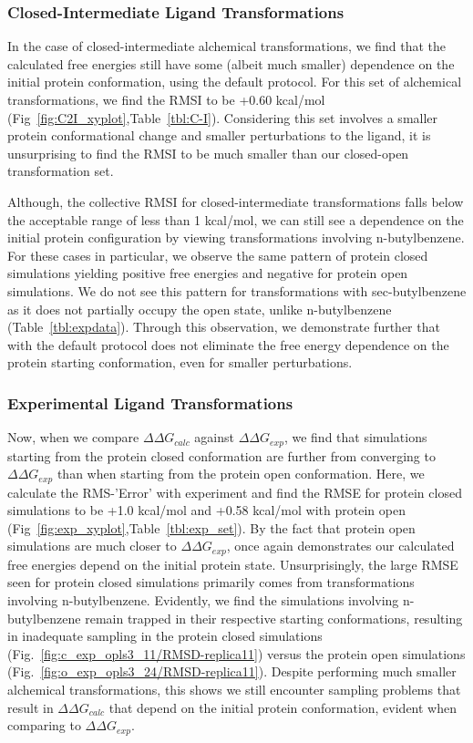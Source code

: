 \documentclass[journal=jctcce,manuscript=article]{achemso}
\begin{document}
\subsubsection*{Closed-Intermediate Ligand Transformations}
In the case of closed-intermediate alchemical transformations, we find that the calculated free energies still have some (albeit much smaller) dependence on the initial protein conformation, using the default protocol.
For this set of alchemical transformations, we find the RMSI to be +0.60 kcal/mol (Fig~\ref{fig:C2I_xyplot},Table~\ref{tbl:C-I}).
Considering this set involves a smaller protein conformational change and smaller perturbations to the ligand, it is unsurprising to find the RMSI to be much smaller than our closed-open transformation set.

Although, the collective RMSI for closed-intermediate transformations falls below the acceptable range of less than 1 kcal/mol, we can still see a dependence on the initial protein configuration by viewing transformations involving n-butylbenzene.
For these cases in particular, we observe the same pattern of protein closed simulations yielding positive free energies and negative for protein open simulations. 
We do not see this pattern for transformations with sec-butylbenzene as it does not partially occupy the open state, unlike n-butylbenzene (Table~\ref{tbl:expdata}).
Through this observation, we demonstrate further that with the default protocol does not eliminate the free energy dependence on the protein starting conformation, even for smaller perturbations.

\subsubsection*{Experimental Ligand Transformations}
Now, when we compare $\Delta\Delta G_{calc}$ against $\Delta\Delta G_{exp}$, we find that simulations starting from the protein closed conformation are further from converging to $\Delta\Delta G_{exp}$ than when starting from the protein open conformation. 
Here, we calculate the RMS-'Error' with experiment and find the RMSE for protein closed simulations to be +1.0 kcal/mol and +0.58 kcal/mol with protein open (Fig~\ref{fig:exp_xyplot},Table~\ref{tbl:exp_set}).
By the fact that protein open simulations are much closer to $\Delta\Delta G_{exp}$, once again demonstrates our calculated free energies depend on the initial protein state.
Unsurprisingly, the large RMSE seen for protein closed simulations primarily comes from transformations involving n-butylbenzene.
Evidently, we find the simulations involving n-butylbenzene remain trapped in their respective starting conformations, resulting in inadequate sampling in the protein closed simulations (Fig.~\ref{fig:c_exp_opls3_11/RMSD-replica11}) versus the protein open simulations (Fig.~\ref{fig:o_exp_opls3_24/RMSD-replica11}).
Despite performing much smaller alchemical transformations, this shows we still encounter sampling problems that result in $\Delta\Delta G_{calc}$ that depend on the initial protein conformation, evident when comparing to $\Delta\Delta G_{exp}$.
\end{document}
